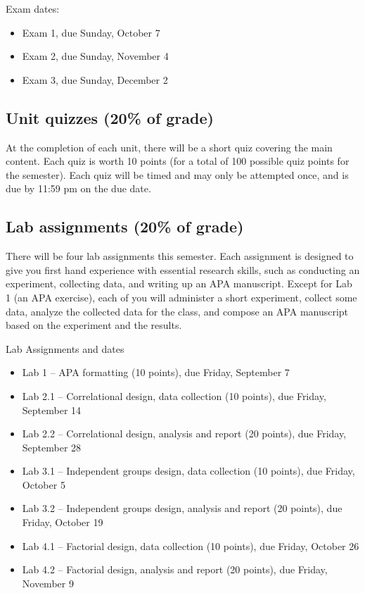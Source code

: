 \documentclass[10pt]{article}
\begin{document}
Exam dates:

\begin{itemize}
\item Exam 1, due Sunday, October 7
\item Exam 2, due Sunday, November 4
\item Exam 3, due Sunday, December 2
\end{itemize}

\subsection*{Unit quizzes (20\% of grade)}
\label{sec-5-2}

At the completion of each unit, there will be a short quiz covering the main content.  Each quiz is worth 10 points (for a total of 100 possible quiz points for the semester).  Each quiz will be timed and may only be attempted once, and is due by 11:59 pm on the due date.

\subsection*{Lab assignments (20\% of grade)}
\label{sec-5-3}

There will be four lab assignments this semester.  Each assignment is designed to give you first hand experience with essential research skills, such as conducting an experiment, collecting data, and writing up an APA manuscript.  Except for Lab 1 (an APA exercise), each of you will administer a short experiment, collect some data, analyze the collected data for the class, and compose an APA manuscript based on the experiment and the results. 

Lab Assignments and dates

\begin{itemize}
\item Lab 1 – APA formatting (10 points), due Friday, September 7
\item Lab 2.1 – Correlational design, data collection (10 points), due Friday, September 14
\item Lab 2.2 – Correlational design, analysis and report (20 points), due Friday, September 28
\item Lab 3.1 – Independent groups design, data collection (10 points), due Friday, October 5
\item Lab 3.2 – Independent groups design, analysis and report (20 points), due Friday, October 19
\item Lab 4.1 – Factorial design, data collection (10 points), due Friday, October 26
\item Lab 4.2 – Factorial design, analysis and report (20 points), due Friday, November 9
\end{itemize}
\end{document}
